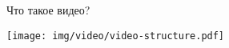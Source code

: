 \begin{frame}{Что такое видео?}
    \begin{center}
        \texttt{[image: img/video/video-structure.pdf]}
    \end{center}
\end{frame}
